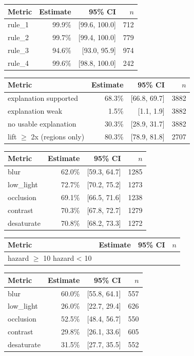 \begin{tabular}{lrrr}
\toprule
Metric & Estimate & 95\% CI & $n$ \\
\midrule
rule\_1 & 99.9\% & [99.6, 100.0] & 712 \\
rule\_2 & 99.7\% & [99.4, 100.0] & 779 \\
rule\_3 & 94.6\% & [93.0, 95.9] & 974 \\
rule\_4 & 99.6\% & [98.8, 100.0] & 242 \\
\bottomrule
\end{tabular}

\begin{tabular}{lrrr}
\toprule
Metric & Estimate & 95\% CI & $n$ \\
\midrule
explanation supported & 68.3\% & [66.8, 69.7] & 3882 \\
explanation weak & 1.5\% & [1.1, 1.9] & 3882 \\
no usable explanation & 30.3\% & [28.9, 31.7] & 3882 \\
lift $\geq$ 2x (regions only) & 80.3\% & [78.9, 81.8] & 2707 \\
\bottomrule
\end{tabular}

\begin{tabular}{lrrr}
\toprule
Metric & Estimate & 95\% CI & $n$ \\
\midrule
blur & 62.0\% & [59.3, 64.7] & 1285 \\
low\_light & 72.7\% & [70.2, 75.2] & 1273 \\
occlusion & 69.1\% & [66.5, 71.6] & 1238 \\
contrast & 70.3\% & [67.8, 72.7] & 1279 \\
desaturate & 70.8\% & [68.2, 73.3] & 1272 \\
\bottomrule
\end{tabular}

\begin{tabular}{lrrr}
\toprule
Metric & Estimate & 95\% CI & $n$ \\
\midrule
hazard $\geq$ 10%
hazard < 10%
\bottomrule
\end{tabular}

\begin{tabular}{lrrr}
\toprule
Metric & Estimate & 95\% CI & $n$ \\
\midrule
blur & 60.0\% & [55.8, 64.1] & 557 \\
low\_light & 26.0\% & [22.7, 29.4] & 626 \\
occlusion & 52.5\% & [48.4, 56.7] & 550 \\
contrast & 29.8\% & [26.1, 33.6] & 605 \\
desaturate & 31.5\% & [27.7, 35.5] & 552 \\
\bottomrule
\end{tabular}


